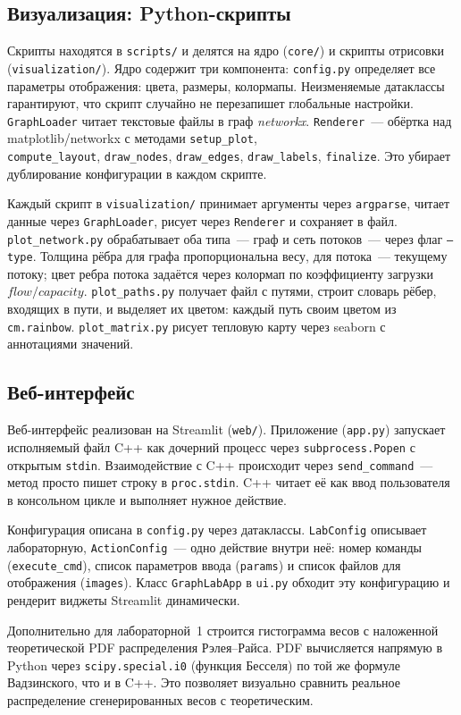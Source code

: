 
\subsection{Визуализация: Python-скрипты}

Скрипты находятся в \texttt{scripts/} и делятся на ядро (\texttt{core/})
и скрипты отрисовки (\texttt{visualization/}). Ядро содержит три компонента: \texttt{config.py} определяет все параметры отображения: цвета, размеры, колормапы. Неизменяемые
датаклассы гарантируют, что скрипт случайно не перезапишет глобальные
настройки. \texttt{GraphLoader} читает текстовые файлы в граф \textit{networkx}. \texttt{Renderer}~--- обёртка над
matplotlib/networkx с методами \texttt{setup\_plot}, \\\texttt{compute\_layout},
\texttt{draw\_nodes}, \texttt{draw\_edges}, \texttt{draw\_labels},
\texttt{finalize}. Это убирает дублирование конфигурации в каждом скрипте.

Каждый скрипт в \texttt{visualization/} принимает аргументы через
\texttt{argparse}, читает данные через \texttt{GraphLoader}, рисует через
\texttt{Renderer} и сохраняет в файл. \texttt{plot\_network.py}
обрабатывает оба типа~--- граф и сеть потоков~--- через флаг \texttt{--type}.
Толщина рёбра для графа пропорциональна весу, для потока~--- текущему потоку;
цвет ребра потока задаётся через колормап по коэффициенту загрузки
$flow/capacity$. \texttt{plot\_paths.py} получает файл с путями,
строит словарь рёбер, входящих в пути, и выделяет их цветом: каждый путь
своим цветом из \texttt{cm.rainbow}. \texttt{plot\_matrix.py} рисует
тепловую карту через seaborn с аннотациями значений.

\subsection{Веб-интерфейс}

Веб-интерфейс реализован на Streamlit (\texttt{web/}). Приложение
(\texttt{app.py}) запускает исполняемый файл C++ как дочерний процесс
через \texttt{subprocess.Popen} с открытым \texttt{stdin}. Взаимодействие
с C++ происходит через \texttt{send\_command}~--- метод просто пишет
строку в \texttt{proc.stdin}. C++ читает её как ввод пользователя в
консольном цикле и выполняет нужное действие.

Конфигурация описана в \texttt{config.py} через датаклассы.
\texttt{LabConfig} описывает лабораторную, \texttt{ActionConfig}~--- одно
действие внутри неё: номер команды (\texttt{execute\_cmd}), список
параметров ввода (\texttt{params}) и список файлов для отображения
(\texttt{images}). Класс \texttt{GraphLabApp} в \texttt{ui.py} обходит
эту конфигурацию и рендерит виджеты Streamlit динамически.

Дополнительно для лабораторной~1 строится гистограмма весов с наложенной
теоретической PDF распределения Рэлея--Райса. PDF вычисляется напрямую в
Python через \texttt{scipy.special.i0} (функция Бесселя) по той же формуле
Вадзинского, что и в C++. Это позволяет визуально сравнить реальное
распределение сгенерированных весов с теоретическим.
